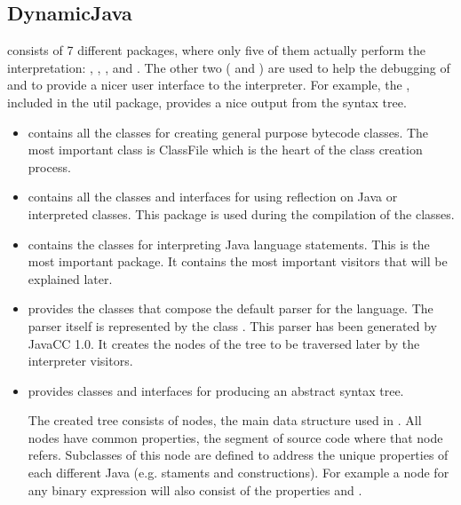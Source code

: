 \subsection{DynamicJava}
\label{sec:DynamicJava}

\djava{} consists of 7 different packages, where only five of them actually perform the interpretation: , , ,  and . The other two ( and ) are used to help the debugging of \djava{} and to provide a nicer user interface to the interpreter. For example, the , included in the util package, provides a nice output from the syntax tree.

\begin{itemize}
\item {} contains all the classes for creating general purpose bytecode classes. The most important class is ClassFile which is the heart of the class creation process.

\item {} contains all the classes and interfaces for using reflection on Java or interpreted classes. This package is used during the compilation of the classes.

\item {} contains the classes for interpreting Java language statements. This is the most important package. It contains the most important visitors that will be explained later.

\item {} provides the classes that compose the default parser for the language. The parser itself is represented by the class . This parser has been generated by JavaCC 1.0. It creates the nodes of the tree to be traversed later by the interpreter visitors.

\item {} provides classes and interfaces for producing an abstract syntax tree.

The created tree consists of nodes, the main data structure used in \djava{}. All nodes have common properties, the segment of source code where that node refers. Subclasses of this node are defined to address the unique properties of each different Java (e.g. staments and constructions). For example a node for any binary expression will also consist of the properties  and .

\end{itemize}

